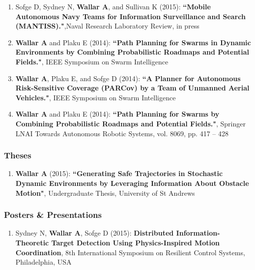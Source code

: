 \documentclass[line,margin]{cv}
\begin{document}
\begin{resume}
\begin{enumerate}
    \item Sofge D, Sydney N, \textbf{Wallar A}, and Sullivan K (2015):
        \textbf{``Mobile Autonomous Navy Teams for Information Surveillance
        and Search (MANTISS)."},Naval Research Laboratory Review, in press

    \item \textbf{Wallar A} and Plaku E (2014): \textbf{``Path Planning for
        Swarms in Dynamic Environments by Combining Probabilistic Roadmaps
        and Potential Fields."}, IEEE Symposium on Swarm Intelligence

    \item \textbf{Wallar A}, Plaku E, and Sofge D (2014): \textbf{``A Planner
        for Autonomous Risk-Sensitive Coverage (PARCov) by a Team of Unmanned
        Aerial Vehicles."}, IEEE Symposium on Swarm Intelligence

    \item \textbf{Wallar A} and Plaku E (2014): \textbf{``Path Planning for
        Swarms by Combining Probabilistic Roadmaps and Potential Fields."},
        Springer LNAI Towards Autonomous Robotic Systems, vol. 8069,
        pp. 417 -- 428

\end{enumerate}

\subsubsection{Theses}

\begin{enumerate}

    \item \textbf{Wallar A} (2015): \textbf{``Generating Safe Trajectories
        in Stochastic Dynamic Environments by Leveraging Information About
        Obstacle Motion"}, Undergraduate Thesis, University of St Andrews

\end{enumerate}


\subsubsection{Posters \& Presentations}

\begin{enumerate}

    \item Sydney N, \textbf{Wallar A}, Sofge D (2015):
        \textbf{Distributed Information-Theoretic Target Detection Using
            Physics-Inspired Motion Coordination}, 8th International Symposium on
            Resilient Control Systems, Philadelphia, USA


\end{enumerate}
\end{resume}
\end{document}
